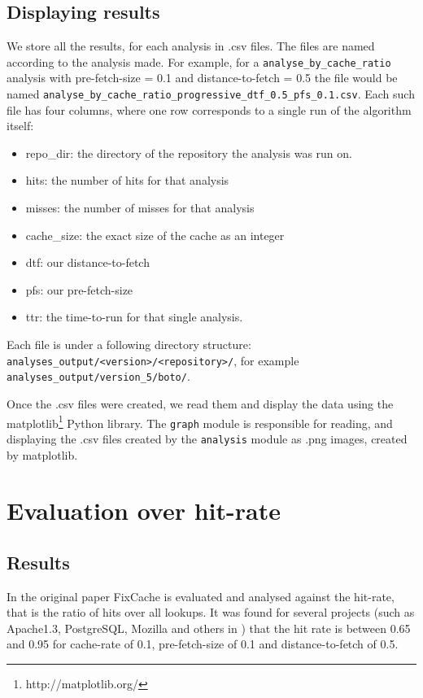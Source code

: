 \documentclass[12pt,twoside,notitlepage]{report}
\newcommand{\fxch}{FixCache }
\begin{document}
\subsection{Displaying results}
We store all the results, for each analysis in .csv files. The files are named according to the analysis made. For example, for a \texttt{analyse\_by\_cache\_ratio} analysis with pre-fetch-size = 0.1 and distance-to-fetch = 0.5 the file would be named \texttt{analyse\_by\_cache\_ratio\_progressive\_dtf\_0.5\_pfs\_0.1.csv}. Each such file has four columns, where one row corresponds to a single run of the algorithm itself: 
\begin{itemize}
\item repo\_dir: the directory of the repository the analysis was run on.
\item hits: the number of hits for that analysis
\item misses: the number of misses for that analysis
\item cache\_size: the exact size of the cache as an integer
\item dtf: our distance-to-fetch
\item pfs: our pre-fetch-size
\item ttr: the time-to-run for that single analysis.
\end{itemize}
Each file is under a following directory structure: \texttt{analyses\_output/<version>/<repository>/}, for example \texttt{analyses\_output/version\_5/boto/}.

Once the .csv files were created, we read them and display the data using the matplotlib\footnote{http://matplotlib.org/} Python library. The \texttt{graph} module is responsible for reading, and displaying the .csv files created by the \texttt{analysis} module as .png images, created by matplotlib.
\section{Evaluation over hit-rate}
\subsection{Results}
In the original paper \fxch is evaluated and analysed against the hit-rate, that is the ratio of hits over all lookups. It was found for several projects (such as Apache1.3, PostgreSQL, Mozilla and others in \cite{FixCache}) that the hit rate is between 0.65 and 0.95 for cache-rate of 0.1, pre-fetch-size of 0.1 and distance-to-fetch of 0.5.
\end{document}
